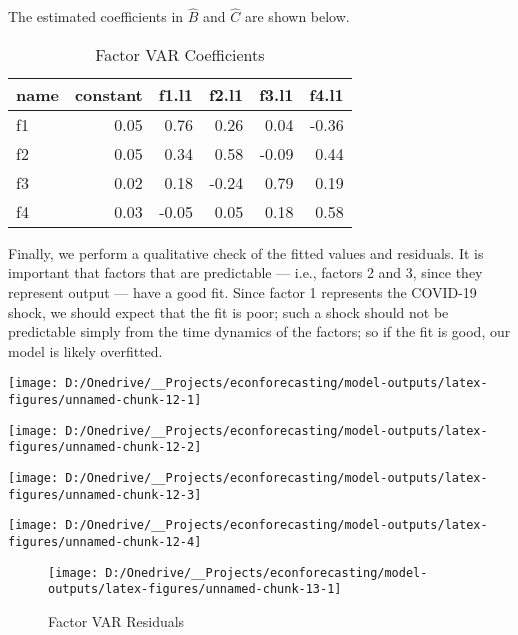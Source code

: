 \documentclass[11pt, letterpaper]{article}\usepackage[]{graphicx}\usepackage[]{color}
\begin{document}
The estimated coefficients in $\widehat{B}$ and $\widehat{C}$ are shown below.
\begin{table}[H]
\centering
\begingroup\footnotesize
\begin{tabular}{lrrrrr}
  \hline
name & constant & f1.l1 & f2.l1 & f3.l1 & f4.l1 \\ 
  \hline
f1 & 0.05 & 0.76 & 0.26 & 0.04 & -0.36 \\ 
  f2 & 0.05 & 0.34 & 0.58 & -0.09 & 0.44 \\ 
  f3 & 0.02 & 0.18 & -0.24 & 0.79 & 0.19 \\ 
  f4 & 0.03 & -0.05 & 0.05 & 0.18 & 0.58 \\ 
   \hline
\end{tabular}
\endgroup
\caption{Factor VAR Coefficients} 
\end{table}



Finally, we perform a qualitative check of the fitted values and residuals. It is important that factors that are predictable --- i.e., factors 2 and 3, since they represent output --- have a good fit. Since factor 1 represents the COVID-19 shock, we should expect that the fit is poor; such a shock should not be predictable simply from the time dynamics of the factors; so if the fit is good, our model is likely overfitted.


{\centering \texttt{[image: D:/Onedrive/\_\_Projects/econforecasting/model-outputs/latex-figures/unnamed-chunk-12-1]} 

}




{\centering \texttt{[image: D:/Onedrive/\_\_Projects/econforecasting/model-outputs/latex-figures/unnamed-chunk-12-2]} 

}




{\centering \texttt{[image: D:/Onedrive/\_\_Projects/econforecasting/model-outputs/latex-figures/unnamed-chunk-12-3]} 

}




{\centering \texttt{[image: D:/Onedrive/\_\_Projects/econforecasting/model-outputs/latex-figures/unnamed-chunk-12-4]} 

}





\begin{figure}[H]

{\centering \texttt{[image: D:/Onedrive/\_\_Projects/econforecasting/model-outputs/latex-figures/unnamed-chunk-13-1]} 

}

\caption[Factor VAR Residuals]{Factor VAR Residuals}\label{fig:unnamed-chunk-13}
\end{figure}
\end{document}
